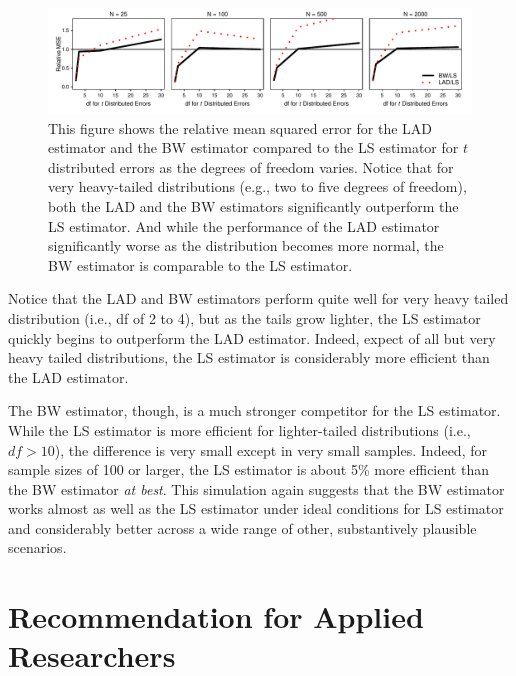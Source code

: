 \documentclass[12pt]{article}
\begin{document}
\begin{figure}[H]
\begin{center}
\includegraphics[width = \textwidth]{figs/mc-sims.pdf}
\caption{This figure shows the relative mean squared error for the LAD estimator and the BW estimator compared to the LS estimator for $t$ distributed errors as the degrees of freedom varies. Notice that for very heavy-tailed distributions (e.g., two to five degrees of freedom), both the LAD and the BW estimators significantly outperform the LS estimator. And while the performance of the LAD estimator significantly worse as the distribution becomes more normal, the BW estimator is comparable to the LS estimator.}\label{fig:mc-sims}
\end{center}
\end{figure}

Notice that the LAD and BW estimators perform quite well for very heavy tailed distribution (i.e., df of 2 to 4), but as the tails grow lighter, the LS estimator quickly begins to outperform the LAD estimator. Indeed, expect of all but very heavy tailed distributions, the LS estimator is considerably more efficient than the LAD estimator. 

The BW estimator, though, is a much stronger competitor for the LS estimator. While the LS estimator is more efficient for lighter-tailed distributions (i.e., $df > 10$), the difference is very small except in very small samples. Indeed, for sample sizes of 100 or larger, the LS estimator is about 5\% more efficient than the BW estimator \textit{at best}. This simulation again suggests that the BW estimator works almost as well as the LS estimator under ideal conditions for LS estimator and considerably better across a wide range of other, substantively plausible scenarios.

\section*{Recommendation for Applied Researchers}
\end{document}
